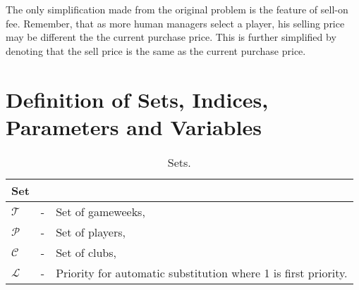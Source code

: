 \newpar

The only simplification made from the original problem is the feature of sell-on fee. Remember, that as more human managers select a player, his selling price may be different the the current purchase price. This is further simplified by denoting that the sell price is the same as the current purchase price. 


\begin{comment}

The only uncertainty in this problem is the number of points a player will get in each gameweek. Hence, the model is formulated accordingly. All the uncertainty lies in the objective function, and this is presented by $\rho_{pt}(\omega)$. This represents the number of points for a player $p$ in a gameweek $t$ dependent on a realization of a future event $\omega$. This event denotes all the factors deciding a player's point in a gameweek. For a goalkeeper, that includes factors such as the number of goals conceded, number of saves, penalty saved etc.

\newpar

Though the objective function is formulated in such way that it maximizes the number of expected points, once the model is solved  the objective value itself is not of interest. In the end it is the optimal team selection for a gameweek that is significant. In addition, the captain- and vice-captain choice, as well as the substitution priority are important outputs. This is reflected in the model by having small positive parameters in the objective function to ensure that these are picked accordingly. 

\end{comment}







\section{Definition of Sets, Indices, Parameters and Variables}\label{def_sets_ind_par_var}

\begin{table}[H]
\centering
\caption{Sets.}
\begin{tabular}{@{}lll@{}}
\toprule
Set           &   &                                                               \\ \midrule
$\mathcal{T}$ & - & Set of gameweeks,                                             \\
$\mathcal{P}$ & - & Set of players,                                               \\
$\mathcal{C}$ & - & Set of clubs,                                                 \\
$\mathcal{L}$ & - & Priority for automatic substitution where 1 is first priority. \\
\bottomrule
\end{tabular}
\end{table}

